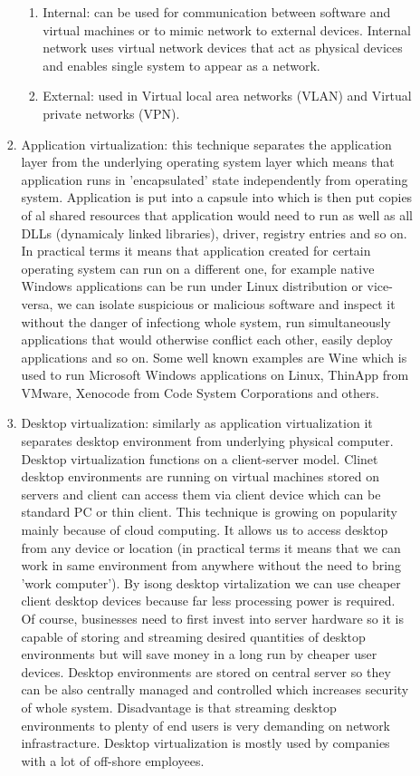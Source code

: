 \begin{itemize}
\begin{enumerate}
\begin{enumerate}
\begin{enumerate}
\item Internal: can be used for communication between software and virtual machines or to mimic network to external devices. Internal network uses virtual network devices that act as physical devices and enables single system to appear as a network.

\item External: used in Virtual local area networks (VLAN) and Virtual private networks (VPN).
\end{enumerate}

\item Application virtualization: this technique separates the application layer from the underlying operating system layer which means that application runs in 'encapsulated' state independently from operating system. Application is put into a capsule into which is then put copies of al shared resources that application would need to run as well as all DLLs (dynamicaly linked libraries), driver, registry entries and so on. In practical terms it means that application created for certain operating system can run on a different one, for example native Windows applications can be run under Linux distribution or vice-versa, we can isolate suspicious or malicious software and inspect it without the danger of infectiong whole system, run simultaneously applications that would otherwise conflict each other, easily deploy applications and so on. Some well known examples are Wine which is used to run Microsoft Windows applications on Linux, ThinApp from VMware, Xenocode from Code System Corporations and others.

\item Desktop virtualization: similarly as application virtualization it separates desktop environment from underlying physical computer. Desktop virtualization functions on a client-server model. Clinet desktop environments are running on virtual machines stored on servers and client can access them via client device which can be standard PC or thin client. This technique is growing on popularity mainly because of cloud computing. It allows us to access desktop from any device or location (in practical terms it means that we can work in same environment from anywhere without the need to bring 'work computer'). By isong desktop virtalization we can use cheaper client desktop devices because far less processing power is required. Of course, businesses need to first invest into server hardware so it is capable of storing and streaming desired quantities of desktop environments but will save money in a long run by cheaper user devices. Desktop environments are stored on central server so they can be also centrally managed and controlled which increases security of whole system. Disadvantage is that streaming desktop environments to plenty of end users is very demanding on network infrastracture. Desktop virtualization is mostly used by companies with a lot of off-shore employees.


\end{enumerate}
\end{enumerate}
\end{itemize}
